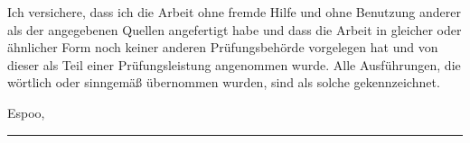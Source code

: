



Ich versichere, dass ich die Arbeit ohne fremde Hilfe und ohne Benutzung anderer als der angegebenen Quellen angefertigt habe und dass die Arbeit in gleicher oder {\"a}hnlicher Form noch keiner anderen Pr{\"u}fungsbeh{\"o}rde vorgelegen hat und von dieser als Teil einer Pr{\"u}fungsleistung angenommen wurde. Alle Ausf{\"u}hrungen, die w{\"o}rtlich oder sinngem{\"a}ß {\"u}bernommen wurden, sind als solche gekennzeichnet.

\vspace{1.5cm}

Espoo, \myTime
\vspace{1.5cm}

\rule{4cm}{0.2mm}
\newline
\myName
\vfill
\newpage

